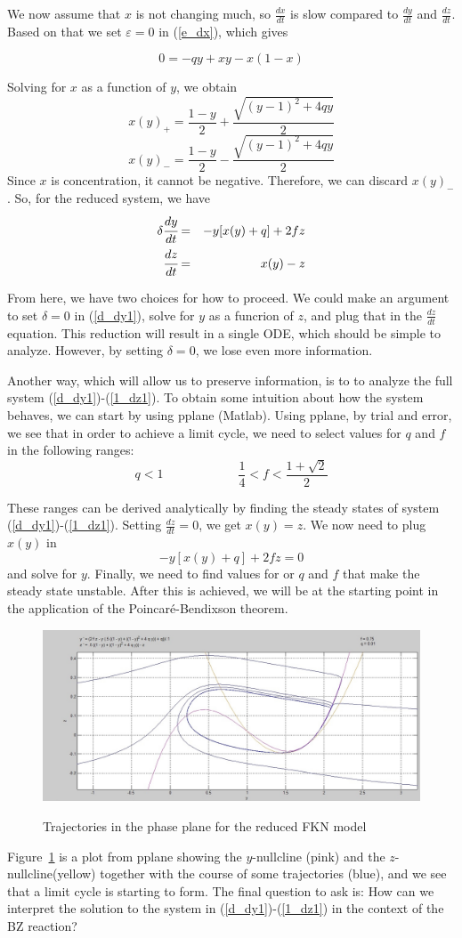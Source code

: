 \documentclass[]{article}
\numberwithin{equation}{section}		%
\def\bea{\begin{eqnarray}}
\def\ena{\end{eqnarray}}
\begin{document}
\indent We now assume that $x$ is not changing much, so $\frac{dx}{dt}$ is slow compared to $\frac{dy}{dt}$ and $\frac{dz}{dt}$. Based on that we set $\varepsilon=0$ in (\ref{e_dx}), which gives

$$0= -qy + xy - x(1-x)$$

Solving for $x$ as a function of $y$, we obtain
$$x(y)_{+}=\frac{1-y}{2}+\frac{\sqrt{(y-1)^2+4qy}}{2}$$
$$x(y)_{-}=\frac{1-y}{2}-\frac{\sqrt{(y-1)^2+4qy}}{2}$$
Since $x$ is concentration, it cannot be negative. Therefore, we can discard $x(y)_{-}$.
So, for the reduced system, we have
\bea
\label{d_dy1}
\delta \cfrac{dy}{dt} & = & -y[x(y)+q]+ 2f z \\
\label{1_dz1}
\cfrac{dz}{dt} & = & x(y) - z
\ena

From here, we have two choices for how to proceed. We could make an argument to set $\delta=0$ in (\ref{d_dy1}), solve for $y$ as a funcrion of $z$, and plug that in the $\frac{dz}{dt}$ equation. This reduction will result in a single ODE, which should be simple to analyze. However, by setting $\delta=0$, we lose even more information.

Another way, which will allow us to preserve information, is to to analyze the full system (\ref{d_dy1})-(\ref{1_dz1}). To obtain some intuition about how the system behaves, we can start by using pplane (Matlab). Using pplane, by trial and error, we see that in order to achieve a limit cycle, we need to select values for $q$ and $f$ in the following ranges:
$$q<1\hspace{1in}\frac{1}{4}<f<\frac{1+\sqrt{2}}{2}$$

These ranges can be derived analytically by finding the steady states of system (\ref{d_dy1})-(\ref{1_dz1}). Setting $\frac{dz}{dt}=0$, we get $x(y)=z$. We now need to plug $x(y)$ in 
$$-y[x(y)+q]+ 2f z=0$$
and solve for $y$. Finally, we need to find values for or $q$ and $f$ that make the steady state unstable. After this is achieved, we will be at the starting point in the application of the Poincar\'{e}-Bendixson theorem.

\begin{figure}
\caption{Trajectories in the phase plane for the reduced FKN model}
\includegraphics[scale=.45]{figures/FKN_figure.jpg}
\label{fig:fkn}
\end{figure}
Figure~\ref{fig:fkn} is a plot from pplane showing the $y$-nullcline (pink) and the $z$-nullcline(yellow) together with the course of some trajectories (blue), and we see that a limit cycle is starting to form. The final question to ask is: How can we interpret the solution to the system in (\ref{d_dy1})-(\ref{1_dz1}) in the context of the BZ reaction?
\end{document}
